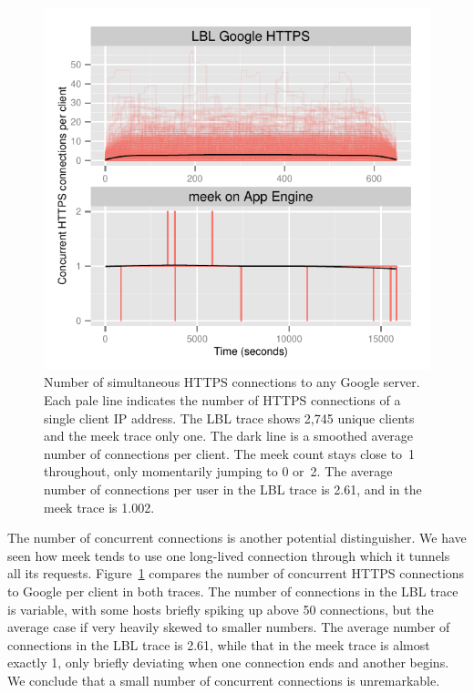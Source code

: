 \documentclass[conference]{IEEEtran}
\begin{document}
\begin{figure}
\centering
\includegraphics[width=\linewidth]{concurrent.pdf}
\caption{
Number of simultaneous HTTPS connections to any Google server.
Each pale line indicates the number of HTTPS connections
of a single client IP address.
The LBL trace shows 2,745 unique clients and the meek trace only one.
The dark line is a smoothed average number of connections per client.
The meek count stays close to~1 throughout, only momentarily
jumping to 0 or~2.
The average number of connections per user in the LBL trace is 2.61,
and in the meek trace is 1.002.
}
\label{fig:concurrent}
\end{figure}

The number of concurrent connections is another potential distinguisher.
We have seen how meek tends to use one long-lived connection
through which it tunnels all its requests.
Figure~\ref{fig:concurrent} compares the number of concurrent HTTPS connections to
Google per client in both traces.
The number of connections in the LBL trace is variable,
with some hosts briefly spiking up above 50 connections,
but the average case if very heavily skewed to smaller numbers.
The average number of connections in the LBL trace is 2.61,
while that in the meek trace is almost exactly 1, only briefly
deviating when one connection ends and another begins.
We conclude that a small number of concurrent connections is unremarkable.
\end{document}
